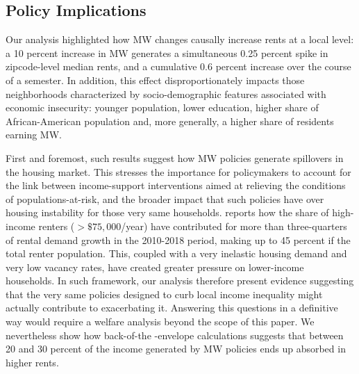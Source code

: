 \subsection{Policy Implications}\label{sec:policy}

Our analysis highlighted how MW changes causally increase rents at a local level: a 10 percent
increase in MW generates a simultaneous 0.25 percent spike in zipcode-level median rents, and 
a cumulative 0.6 percent increase over the course of a semester. In addition, this effect 
disproportionately impacts those neighborhoods characterized by socio-demographic
features associated with economic insecurity: younger population, lower education, 
higher share of African-American population and, more generally, a higher share of residents 
earning MW. 

First and foremost, such results suggest how MW policies generate spillovers in the housing market. 
This stresses the importance for policymakers to account for the link between 
income-support interventions aimed at relieving the conditions of populations-at-risk, 
and the broader impact that such policies have over housing instability for those very same households.
\textcite{fernald2020americas} reports how the share of high-income renters ($>\$75,000$/year) have contributed for more
than three-quarters of rental demand growth in the 2010-2018 period, making up to 45 percent 
if the total renter population. This, coupled with a very inelastic housing demand and very low 
vacancy rates, have created greater pressure on lower-income households. In such framework, our analysis 
therefore present evidence suggesting that the very same policies designed to curb local income inequality
might actually contribute to exacerbating it. Answering this questions in a definitive way 
would require a welfare analysis beyond the scope of this paper. We nevertheless show how back-of-the
-envelope calculations suggests that between 20 and 30 percent of the income generated by MW policies 
ends up absorbed in higher rents.


